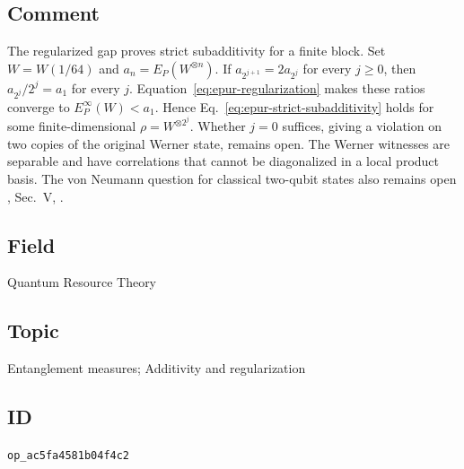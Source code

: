 \subsection*{Comment}

The regularized gap proves strict subadditivity for a finite block. Set $W=W(1/64)$ and $a_n=E_P(W^{\otimes n})$. If $a_{2^{j+1}}=2a_{2^j}$ for every $j\geq 0$, then $a_{2^j}/2^j=a_1$ for every $j$. Equation~\eqref{eq:epur-regularization} makes these ratios converge to $E_P^\infty(W)<a_1$. Hence Eq.~\eqref{eq:epur-strict-subadditivity} holds for some finite-dimensional $\rho=W^{\otimes 2^j}$. Whether $j=0$ suffices, giving a violation on two copies of the original Werner state, remains open. The Werner witnesses are separable and have correlations that cannot be diagonalized in a local product basis. The von Neumann question for classical two-qubit states also remains open , Sec.~V, .

\subsection*{Field}

Quantum Resource Theory

\subsection*{Topic}

Entanglement measures; Additivity and regularization

\subsection*{ID}

\texttt{op\_ac5fa4581b04f4c2}
